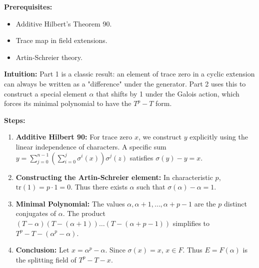 \begin{solution}
\textbf{Prerequisites:}
\begin{itemize}
    \item Additive Hilbert's Theorem 90.
    \item Trace map in field extensions.
    \item Artin-Schreier theory.
\end{itemize}

\textbf{Intuition:}
Part 1 is a classic result: an element of trace zero in a cyclic extension can always be written as a "difference" under the generator. Part 2 uses this to construct a special element $\alpha$ that shifts by 1 under the Galois action, which forces its minimal polynomial to have the $T^p-T$ form.

\par

\textbf{Steps:}
\begin{enumerate}
    \item \textbf{Additive Hilbert 90:} For trace zero $x$, we construct $y$ explicitly using the linear independence of characters. A specific sum $y = \sum_{j=0}^{n-1} (\sum_{i=0}^j \sigma^i(x)) \sigma^j(z)$ satisfies $\sigma(y)-y=x$.

    \item \textbf{Constructing the Artin-Schreier element:} In characteristic $p$, $\mathrm{tr}(1) = p \cdot 1 = 0$. Thus there exists $\alpha$ such that $\sigma(\alpha) - \alpha = 1$.

    \item \textbf{Minimal Polynomial:} The values $\alpha, \alpha+1, \dots, \alpha+p-1$ are the $p$ distinct conjugates of $\alpha$. The product $(T-\alpha)(T-(\alpha+1))\dots(T-(\alpha+p-1))$ simplifies to $T^p-T - (\alpha^p-\alpha)$.

    \item \textbf{Conclusion:} Let $x = \alpha^p-\alpha$. Since $\sigma(x)=x$, $x \in F$. Thus $E = F(\alpha)$ is the splitting field of $T^p-T-x$.
\end{enumerate}
\end{solution}
